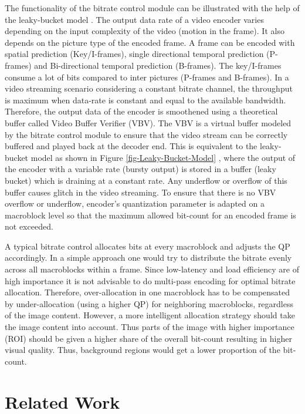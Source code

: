 \documentclass[11pt]{article} %
\begin{document}
	The functionality of the bitrate control module can be illustrated with the help of the leaky-bucket model \cite{InTech-Rate-control-in-video-coding}. The output data rate of a video encoder varies depending on the input complexity of the video (motion in the frame). It also depends on the picture type of the encoded frame. A frame can be encoded with spatial prediction (Key/I-frames), single directional temporal prediction (P-frames) and Bi-directional temporal prediction (B-frames). The key/I-frames consume a lot of bits compared to inter pictures (P-frames and B-frames). In a video streaming scenario considering a constant bitrate channel, the throughput is maximum when data-rate is constant and equal to the available bandwidth. Therefore, the output data of the encoder is smoothened using a theoretical buffer called Video Buffer Verifier (VBV). The VBV is a virtual buffer modeled by the bitrate control module to ensure that the video stream can be correctly buffered and played back at the decoder end. This is equivalent to the leaky-bucket model as shown in Figure \ref{fig-Leaky-Bucket-Model} \cite{Leaky-bucket-NSI}, where the output of the encoder with a variable rate (bursty output) is stored in a buffer (leaky bucket) which is draining at a constant rate.  Any underflow or overflow of this buffer causes glitch in the video streaming. To ensure that there is no VBV overflow or underflow, encoder's quantization parameter is adapted on a macroblock level so that the maximum allowed bit-count for an encoded frame is not exceeded.

 A typical bitrate control allocates bits at every macroblock and adjusts the QP accordingly. In a simple approach one would try to distribute the bitrate evenly across all macroblocks within a frame. Since low-latency and load efficiency are of high importance it is not advisable to do multi-pass encoding for optimal bitrate allocation. Therefore, over-allocation in one macroblock has to be compensated by under-allocation (using a higher QP) for neighboring macroblocks, regardless of the image content. However, a more intelligent allocation strategy should take the image content into account. Thus parts of the image with higher importance (ROI) should be given a higher share of the overall bit-count resulting in higher visual quality. Thus, background regions would get a lower proportion of the bit-count.
\clearpage

\section{Related Work}
\end{document}
